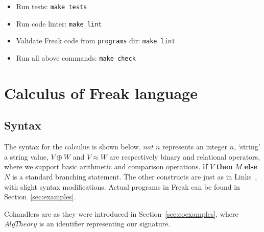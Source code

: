 \documentclass[declaration,shortabstract]{iithesis}
\theoremstyle{definition} \newtheorem{definition}{Definition}[chapter]
\theoremstyle{remark} \newtheorem{remark}[definition]{Observation}
\theoremstyle{plain} \newtheorem{theorem}[definition]{Theorem}
\theoremstyle{plain} \newtheorem{lemma}[definition]{Lemma}
\begin{document}
    \begin{itemize}
        \item Run tests: \verb!make tests!
        \item Run code linter: \verb!make lint!
        \item Validate Freak code from \verb!programs! dir: \verb!make lint!
        \item Run all above commands: \verb!make check!
    \end{itemize}

\chapter{Calculus of Freak language}\label{chapter:calculus-of-freak-language}
\section{Syntax}

    The syntax for the calculus is shown below. $nat \; n$ represents an integer $n$,
    `string' a string value, $V \oplus W$ and $V \approx W$ are respectively
    binary and relational operators, where we support basic arithmetic and
    comparison operations. \textbf{if} $V$ \textbf{then} $M$ \textbf{else} $N$
    is a standard branching statement. The other constructs are just as in
    Links~\cite{handlers-cps-journal}, with slight syntax modifications.
    Actual programs in Freak can be found in Section~\ref{sec:examples}.

    Cohandlers are as they were introduced in Section~\ref{sec:coexamples},
    where $AlgTheory$ is an identifier representing our signature.
\end{document}
